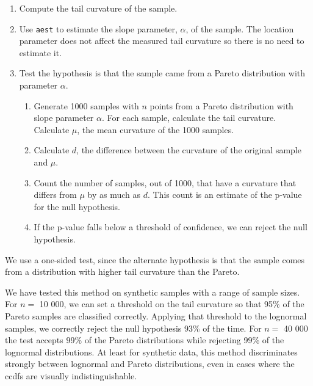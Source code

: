 \documentclass{elsart}
\begin{document}
\begin{enumerate}

\item Compute the tail curvature of the sample.

\item Use \texttt{aest} to estimate the slope parameter, $\alpha$, of the
sample.  The location parameter does not affect the measured tail
curvature so there is no need to estimate it.

\item Test the hypothesis is that the sample came from a Pareto
distribution with parameter $\alpha$.

\begin{enumerate}

\item Generate 1000 samples with $n$ points from a Pareto distribution
with slope parameter $\alpha$.
For each sample, calculate the tail curvature.
Calculate $\mu$, the mean curvature of the 1000 samples.

\item Calculate $d$, the difference between the curvature of the
original sample and $\mu$.

\item Count the number of samples, out of 1000, that have
a curvature that differs from $\mu$ by as much as $d$.
This count is an estimate of the p-value for the null hypothesis.

\item If the p-value falls below a threshold of confidence, we
can reject the null hypothesis.

\end{enumerate}

\end{enumerate}

We use a one-sided test, since the alternate hypothesis is that the
sample comes from a distribution with higher tail curvature than 
the Pareto.

We have tested this method on synthetic samples with a range
of sample sizes.  For $n =$ 10 000, we can set a threshold
on the tail curvature so that 95\% of the Pareto samples are
classified correctly.  Applying that threshold to the
lognormal samples, we correctly reject the null hypothesis
93\% of the time.  For $n =$ 40 000 the test accepts 99\% of the
Pareto distributions while rejecting 99\% of the lognormal
distributions.  At least for synthetic data, this method discriminates
strongly between lognormal and Pareto distributions, even in
cases where the ccdfs are visually indistinguishable.
\end{document}
